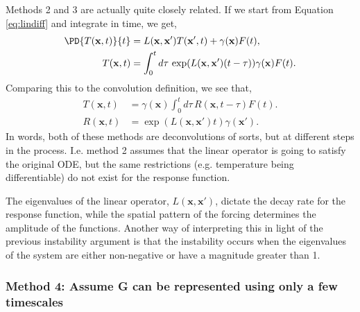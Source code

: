 Methods 2 and 3 are actually quite closely related. If we start from Equation \ref{eq:lindiff} and integrate in time, we get,
\begin{align}
  \PD{T(\mathbf{x},t)}{t} &= L(\mathbf{x},\mathbf{x}')T(\mathbf{x}',t) + \gamma(\mathbf{x})F(t),\\
  T(\mathbf{x},t) &= \int_0^t d\tau \, \exp(L(\mathbf{x},\mathbf{x}')(t-\tau)) \gamma(\mathbf{x})F(t).
\end{align}
Comparing this to the convolution definition, we see that,
\begin{align}
  T(\mathbf{x},t) &= \gamma(\mathbf{x}) \int_0^t d\tau \, R(\mathbf{x},t - \tau) F(t).\\
  R(\mathbf{x},t) &= \exp(L(\mathbf{x},\mathbf{x}')t) \gamma(\mathbf{x}').
\end{align}
In words, both of these methods are deconvolutions of sorts, but at different steps in the process. I.e. method 2 assumes that the linear operator is going to satisfy the original ODE, but the same restrictions (e.g. temperature being differentiable) do not exist for the response function.

The eigenvalues of the linear operator, $L(\mathbf{x},\mathbf{x}')$, dictate the decay rate for the response function, while the spatial pattern of the forcing determines the amplitude of the functions. Another way of interpreting this in light of the previous instability argument is that the instability occurs when the eigenvalues of the system are either non-negative or have a magnitude greater than 1.

\subsubsection{Method 4: Assume G can be represented using only a few timescales}

